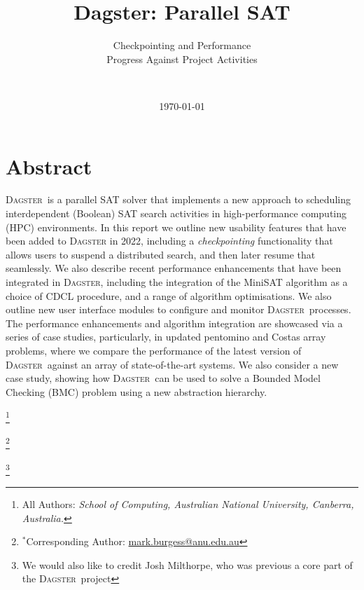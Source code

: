 \documentclass[10pt,a4paper,oneside,headinclude,footinclude,BCOR5mm]{scrartcl}
\title{Dagster: Parallel SAT}
\subtitle{Checkpointing and Performance\\ Progress Against Project Activities}
\author{\spacedlowsmallcaps{Mark Burgess$^*$, Charles Gretton,}\\\spacedlowsmallcaps{Luke Croak, Tom Willingham}}
\date{\today}
\newcommand{\dagster}{\textsc{Dagster}\xspace}
\begin{document}
\newcommand\blfootnote[1]{%
  \begingroup
  \renewcommand\thefootnote{}\footnote{#1}%
  \addtocounter{footnote}{-1}%
  \endgroup
}


\renewcommand{\sectionmark}[1]{\markright{\spacedlowsmallcaps{#1}}} %
\lehead{\mbox{\llap{\small\thepage\kern1em\color{halfgray} \vline}\color{halfgray}\hspace{0.5em}\rightmark\hfil}} %
\pagestyle{scrheadings} %


\maketitle %


\section*{Abstract}


\dagster\ is a parallel SAT solver that implements a new approach to scheduling interdependent (Boolean) SAT search activities in high-performance computing (HPC) environments.
In this report we outline new usability features that have been added to \dagster in 2022, including a {\em checkpointing} functionality that allows users to suspend a distributed search, and then later resume that seamlessly.
We also describe recent performance enhancements that have been integrated in \dagster, including the integration of the {\textsc MiniSAT} algorithm as a choice of CDCL procedure, and a range of algorithm optimisations.
We also outline new user interface modules to configure and monitor \dagster\ processes.
The performance enhancements and algorithm integration are showcased via a series of case studies, particularly, in updated pentomino and Costas array problems, where we compare the performance of the latest version of \dagster\ against an array of state-of-the-art systems.
We also consider a new case study, showing how \dagster\ can be used to solve a Bounded Model Checking (BMC) problem using a new abstraction hierarchy.


\blfootnote{All Authors: \textit{School of Computing, Australian National University, Canberra, Australia.}}
\blfootnote{$^*$Corresponding Author: \url{mark.burgess@anu.edu.au}}
\blfootnote{We would also like to credit Josh Milthorpe, who was previous a core part of the \dagster\ project}
\end{document}
